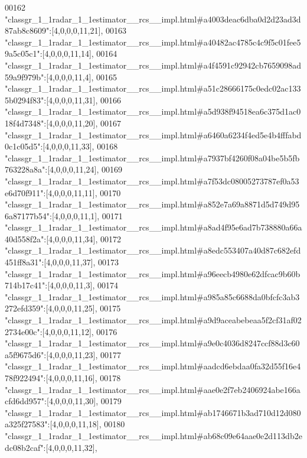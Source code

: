 \begin{DoxyCode}
00162 \textcolor{stringliteral}{"classgr\_1\_1radar\_1\_1estimator\_\_rcs\_\_impl.html#a4003deac6dba0d2d23ad3d87ab8c8609"}:[4,0,0,0,11,21],
00163 \textcolor{stringliteral}{"classgr\_1\_1radar\_1\_1estimator\_\_rcs\_\_impl.html#a40482ac4785c4c9f5c01fee59a5c05c1"}:[4,0,0,0,11,14],
00164 \textcolor{stringliteral}{"classgr\_1\_1radar\_1\_1estimator\_\_rcs\_\_impl.html#a4f4591c92942cb7659098ad59a9f979b"}:[4,0,0,0,11,4],
00165 \textcolor{stringliteral}{"classgr\_1\_1radar\_1\_1estimator\_\_rcs\_\_impl.html#a51c28666175c0edc02ac1335b0294f83"}:[4,0,0,0,11,31],
00166 \textcolor{stringliteral}{"classgr\_1\_1radar\_1\_1estimator\_\_rcs\_\_impl.html#a5d938f94518ea6c375d1ac018f4d7348"}:[4,0,0,0,11,20],
00167 \textcolor{stringliteral}{"classgr\_1\_1radar\_1\_1estimator\_\_rcs\_\_impl.html#a6460a6234f4ed5e4b4fffabd0c1c05d5"}:[4,0,0,0,11,33],
00168 \textcolor{stringliteral}{"classgr\_1\_1radar\_1\_1estimator\_\_rcs\_\_impl.html#a7937bf4260f08a04be5b5fb763228a8a"}:[4,0,0,0,11,24],
00169 \textcolor{stringliteral}{"classgr\_1\_1radar\_1\_1estimator\_\_rcs\_\_impl.html#a7f53dc08005273787ef0a53e6d70f911"}:[4,0,0,0,11,11],
00170 \textcolor{stringliteral}{"classgr\_1\_1radar\_1\_1estimator\_\_rcs\_\_impl.html#a852e7a69a8871d5d749d956a87177b54"}:[4,0,0,0,11,1],
00171 \textcolor{stringliteral}{"classgr\_1\_1radar\_1\_1estimator\_\_rcs\_\_impl.html#a8ad4f95e6ad7b738880a66a40d558f2a"}:[4,0,0,0,11,34],
00172 \textcolor{stringliteral}{"classgr\_1\_1radar\_1\_1estimator\_\_rcs\_\_impl.html#a8edc553407a40d87c682efd451ff8a31"}:[4,0,0,0,11,37],
00173 \textcolor{stringliteral}{"classgr\_1\_1radar\_1\_1estimator\_\_rcs\_\_impl.html#a96eecb4980e62dfcac9b60b714b17c41"}:[4,0,0,0,11,3],
00174 \textcolor{stringliteral}{"classgr\_1\_1radar\_1\_1estimator\_\_rcs\_\_impl.html#a985a85c6688da0bfcfc3ab3272efd359"}:[4,0,0,0,11,25],
00175 \textcolor{stringliteral}{"classgr\_1\_1radar\_1\_1estimator\_\_rcs\_\_impl.html#a9d9aceabebeaa5f2cf31af022734e00c"}:[4,0,0,0,11,12],
00176 \textcolor{stringliteral}{"classgr\_1\_1radar\_1\_1estimator\_\_rcs\_\_impl.html#a9e0c4036d8247ccf88d3c60a5f9675d6"}:[4,0,0,0,11,23],
00177 \textcolor{stringliteral}{"classgr\_1\_1radar\_1\_1estimator\_\_rcs\_\_impl.html#aadcd6ebdaa0fa32d55f16e478f922494"}:[4,0,0,0,11,16],
00178 \textcolor{stringliteral}{"classgr\_1\_1radar\_1\_1estimator\_\_rcs\_\_impl.html#aae0e2f7eb2406924abe166acfd6dd957"}:[4,0,0,0,11,30],
00179 \textcolor{stringliteral}{"classgr\_1\_1radar\_1\_1estimator\_\_rcs\_\_impl.html#ab1746671b3ad710d12d080a325f27583"}:[4,0,0,0,11,18],
00180 \textcolor{stringliteral}{"classgr\_1\_1radar\_1\_1estimator\_\_rcs\_\_impl.html#ab68c09e64aae0e2d113db2edc08b2caf"}:[4,0,0,0,11,32],

\end{DoxyCode}

